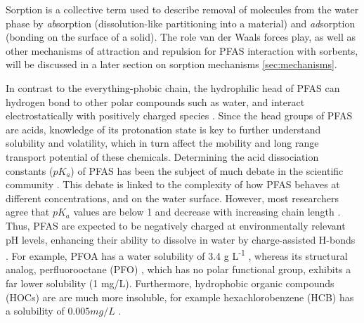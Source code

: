 Sorption is a collective term used to describe removal of molecules from the water phase by \textit{ab}sorption (dissolution-like partitioning into a material) and \textit{ad}sorption (bonding on the surface of a solid). The role van der Waals forces play, as well as other mechanisms of attraction and repulsion for PFAS interaction with sorbents, will be discussed in a later section on sorption mechanisms \cref{sec:mechanisms}. 

In contrast to the everything-phobic chain, the hydrophilic head of PFAS can hydrogen bond to other polar compounds such as water, and interact electrostatically with positively charged species \citep{sigmund2022sorption}. Since the head groups of PFAS are acids, knowledge of its protonation state is key to further understand solubility and volatility, which in turn affect the mobility and long range transport potential of these chemicals. Determining the acid dissociation constants (\(pK_a\)) of PFAS has been the subject of much debate in the scientific community \citep{Goss2009comment}. This debate is linked to the complexity of how PFAS behaves at different concentrations, and on the water surface. However, most researchers agree that \(pK_a\) values are below 1 and decrease with increasing chain length \citep{wang2011physchem,Reemtsma2016}. Thus, PFAS are expected to be negatively charged at environmentally relevant pH levels, enhancing their ability to dissolve in water by charge-assisted H-bonds \citep{Reemtsma2016}. For example, PFOA has a water solubility of 3.4 g L\textsuperscript{-1} \citep{PFOA}, whereas its structural analog, perfluorooctane (PFO) \citep{PFO}, which has no polar functional group, exhibits a far lower solubility (1 mg/L). Furthermore, hydrophobic organic compounds (\acrshort{HOC}s) are are much more insoluble, for example hexachlorobenzene (HCB) has a solubility of $0.005 mg/L$ \citep{mcphedran2013hydrophobic}. 

